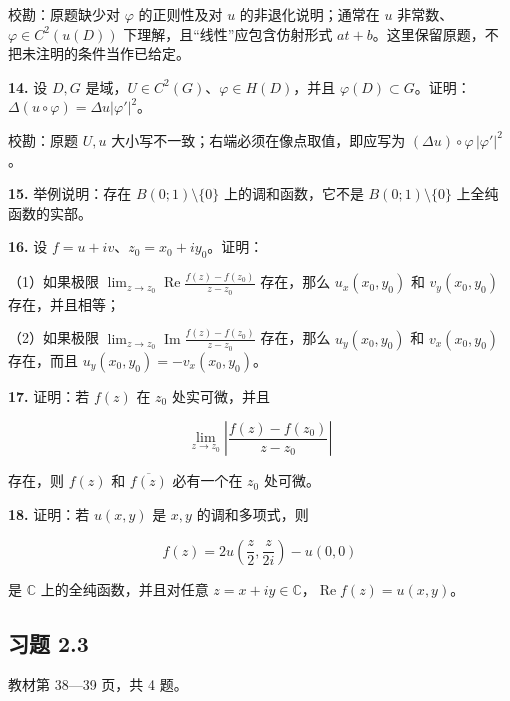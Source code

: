 \documentclass[11pt,a4paper]{article}
\begin{document}
校勘：原题缺少对 \(\varphi\) 的正则性及对 \(u\) 的非退化说明；通常在
\(u\) 非常数、\(\varphi\in C^2(u(D))\) 下理解，且``线性''应包含仿射形式
\(at+b\)。这里保留原题，不把未注明的条件当作已给定。

\par{}
\noindent\textbf{14.} 设 \(D,G\) 是域，\(U\in C^2(G)\)、\(\varphi\in H(D)\)，并且
\(\varphi(D)\subset G\)。证明：\(\Delta(u\circ\varphi)=\Delta u|\varphi'|^2\)。

校勘：原题 \(U,u\) 大小写不一致；右端必须在像点取值，即应写为
\((\Delta u)\circ\varphi\,|\varphi'|^2\)。

\par{}
\noindent\textbf{15.} 举例说明：存在 \(B(0;1)\setminus\{0\}\)
上的调和函数，它不是 \(B(0;1)\setminus\{0\}\) 上全纯函数的实部。

\par{}
\noindent\textbf{16.} 设 \(f=u+iv\)、\(z_0=x_0+iy_0\)。证明：

（1）如果极限
\(\displaystyle\lim_{z\to z_0}\operatorname{Re}\frac{f(z)-f(z_0)}{z-z_0}\)
存在，那么 \(u_x(x_0,y_0)\) 和 \(v_y(x_0,y_0)\) 存在，并且相等；

（2）如果极限
\(\displaystyle\lim_{z\to z_0}\operatorname{Im}\frac{f(z)-f(z_0)}{z-z_0}\)
存在，那么 \(u_y(x_0,y_0)\) 和 \(v_x(x_0,y_0)\) 存在，而且
\(u_y(x_0,y_0)=-v_x(x_0,y_0)\)。

\par{}
\noindent\textbf{17.} 证明：若 \(f(z)\) 在 \(z_0\) 处实可微，并且

\[
\lim_{z\to z_0}\left|\frac{f(z)-f(z_0)}{z-z_0}\right|
\]

存在，则 \(f(z)\) 和 \(\overline{f(z)}\) 必有一个在 \(z_0\) 处可微。

\par{}
\noindent\textbf{18.} 证明：若 \(u(x,y)\) 是 \(x,y\) 的调和多项式，则

\[
f(z)=2u\left(\frac z2,\frac z{2i}\right)-u(0,0)
\]

是 \(\mathbb C\) 上的全纯函数，并且对任意
\(z=x+iy\in\mathbb C\)，\(\operatorname{Re}f(z)=u(x,y)\)。

\subsection{习题 2.3}\label{ch02-practice-ux4e60ux9898-2.3}

教材第 38---39 页，共 4 题。
\end{document}

